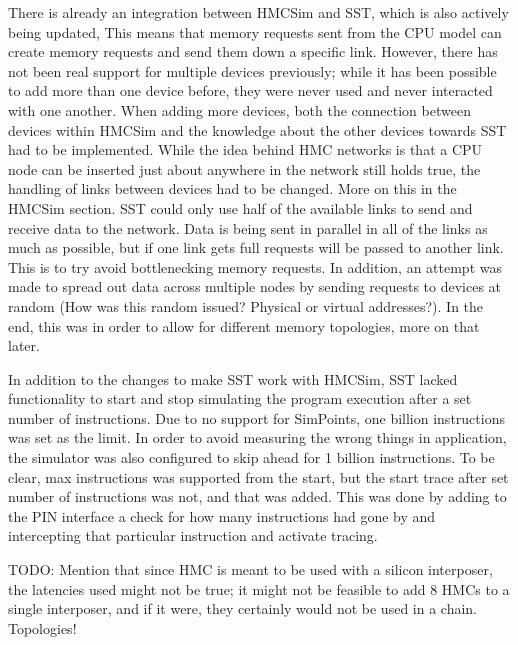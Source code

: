 There is already an integration between HMCSim and SST, which is also actively being updated, This means that memory requests sent from the CPU model can create memory requests and send them down a specific link. However, there has not been real support for multiple devices previously; while it has been possible to add more than one device before, they were never used and never interacted with one another. When adding more devices, both the connection between devices within HMCSim and the knowledge about the other devices towards SST had to be implemented. While the idea behind HMC networks is that a CPU node can be inserted just about anywhere in the network still holds true, the handling of links between devices had to be changed. More on this in the HMCSim section. SST could only use half of the available links to send and receive data to the network. Data is being sent in parallel in all of the links as much as possible, but if one link gets full requests will be passed to another link. This is to try avoid bottlenecking memory requests. In addition, an attempt was made to spread out data across multiple nodes by sending requests to devices at random (How was this random issued? Physical or virtual addresses?). In the end, this was in order to allow for different memory topologies, more on that later. 

In addition to the changes to make SST work with HMCSim, SST lacked functionality to start and stop simulating the program execution after a set number of instructions. Due to no support for SimPoints, one billion instructions was set as the limit. In order to avoid measuring the wrong things in application, the simulator was also configured to skip ahead for 1 billion instructions. To be clear, max instructions was supported from the start, but the start trace after set number of instructions was not, and that was added. This was done by adding to the PIN interface a check for how many instructions had gone by and intercepting that particular instruction and activate tracing. 

TODO: Mention that since HMC is meant to be used with a silicon interposer, the latencies used might not be true; it might not be feasible to add 8 HMCs to a single interposer, and if it were, they certainly would not be used in a chain. Topologies!


